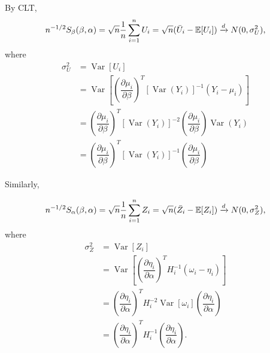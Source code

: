 \documentclass[UTF8,a4paper,10pt]{article}
\begin{document}
By CLT,
\begin{equation*}
  \begin{aligned}
    n^{-1/2}S_{\beta}(\beta, \alpha)=\sqrt{n}\frac{1}{n}\sum_{i=1}^{n}U_i = \sqrt{n}(\bar{U}_i - \operatorname{\mathbb{E}}[U_i]) \xrightarrow{d} N(0,\sigma_{U}^2),
  \end{aligned}
\end{equation*}
where
\begin{equation*}
  \begin{aligned}
    \sigma_{U}^2 
    &= \operatorname{Var}[U_i] \\
    &= \operatorname{Var}[\left(\dfrac{\partial \mu_{i}}{\partial \beta}\right)^{T}\left[\operatorname{Var}\left(Y_{i}\right)\right]^{-1}\left(Y_{i}-\mu_{i}\right)]\\
    &=\left(\dfrac{\partial \mu_{i}}{\partial \beta}\right)^{T}\left[\operatorname{Var}\left(Y_{i}\right)\right]^{-2}\left(\dfrac{\partial \mu_{i}}{\partial \beta}\right)\operatorname{Var}(Y_i)\\
    &=\left(\dfrac{\partial \mu_{i}}{\partial \beta}\right)^{T}\left[\operatorname{Var}\left(Y_{i}\right)\right]^{-1}\left(\dfrac{\partial \mu_{i}}{\partial \beta}\right)
  \end{aligned}
\end{equation*}


Similarly,



\begin{equation*}
  \begin{aligned}
    n^{-1/2}S_{\alpha}(\beta, \alpha)=\sqrt{n}\frac{1}{n}\sum_{i=1}^{n}Z_i = \sqrt{n}(\bar{Z}_i - \operatorname{\mathbb{E}}[Z_i]) \xrightarrow{d} N(0,\sigma_{Z}^2),
  \end{aligned}
\end{equation*}
where
\begin{equation*}
  \begin{aligned}
    \sigma_{Z}^2 
    &= \operatorname{Var}[Z_i] \\
    &= \operatorname{Var}[\left(\dfrac{\partial \eta_{i}}{\partial \alpha}\right)^{T} H_{i}^{-1}\left(\omega_{i}-\eta_{i}\right)]\\
    &=\left(\dfrac{\partial \eta_{i}}{\partial \alpha}\right)^{T} H_{i}^{-2}\operatorname{Var}[\omega_i]\left(\dfrac{\partial \eta_{i}}{\partial \alpha}\right)\\
    &=\left(\dfrac{\partial \eta_{i}}{\partial \alpha}\right)^{T} H_{i}^{-1}\left(\dfrac{\partial \eta_{i}}{\partial \alpha}\right).
  \end{aligned}
\end{equation*}
\end{document}
